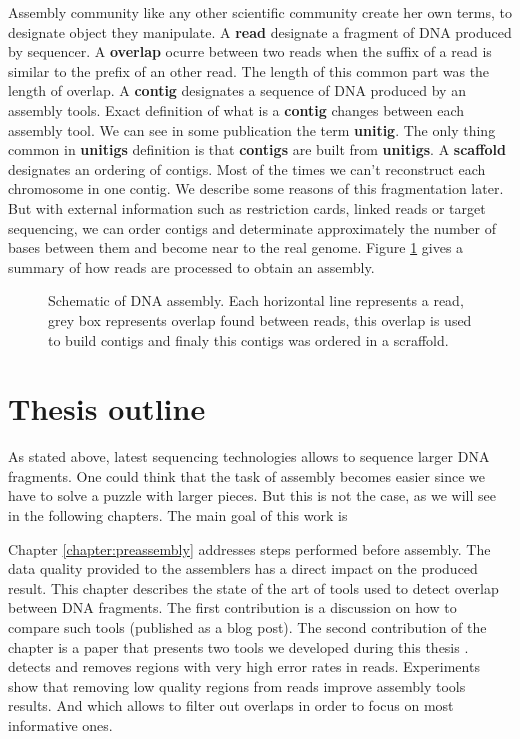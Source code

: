\documentclass[./main.tex]{subfiles}
\begin{document}
\bigskip

Assembly community like any other scientific community create her own terms, to designate object they manipulate.%
%
A \textbf{read} designate a fragment of DNA produced by sequencer.
%
A \textbf{overlap} ocurre between two reads when the suffix of a read is similar to the prefix of an other read. The length of this common part was the length of overlap.
%
A \textbf{contig} designates a sequence of DNA produced by an assembly tools. Exact definition of what is a \textbf{contig} changes between each assembly tool. We can see in some publication the term \textbf{unitig}. The only thing common in \textbf{unitigs} definition is that \textbf{contigs} are built from \textbf{unitigs}.
%
A \textbf{scaffold} designates an ordering of contigs. Most of the times we can't reconstruct each chromosome in one contig. We describe some reasons of this fragmentation later. But with external information such as restriction cards, linked reads or target sequencing, we can order contigs and determinate approximately the number of bases between them and become near to the real genome.%
%
Figure \ref{intro:fig:assembly} gives a summary of how reads are processed to obtain an assembly.
\begin{figure}[ht]
	\centering
	
	\caption{Schematic of DNA assembly. Each horizontal line represents a read, grey box represents overlap found between reads, this overlap is used to build contigs and finaly this contigs was ordered in a scraffold.}
    \label{intro:fig:assembly}
\end{figure}

\section{Thesis outline}


As stated above, latest sequencing technologies allows to sequence larger DNA fragments. One could think that the task of assembly becomes easier since we have to solve a puzzle with larger pieces. But this is not the case, as we will see in the following chapters. The main goal of this work is 


Chapter \ref{chapter:preassembly} addresses steps performed before assembly. %
The  data quality  provided to the assemblers has a direct impact on the produced result.%
This chapter describes the state of the art of tools used to detect overlap between DNA fragments. The first contribution is a discussion on how to compare such tools (published as a blog post). 
The second contribution of the chapter is a paper that presents two tools we developed during this thesis \cite{yacrd}.
\yacrd  detects and removes regions with very high error rates in reads.
Experiments show that removing  low quality regions from reads improve assembly tools results.%
And \fpa which allows to filter out overlaps in order to focus on most informative ones.
\end{document}
